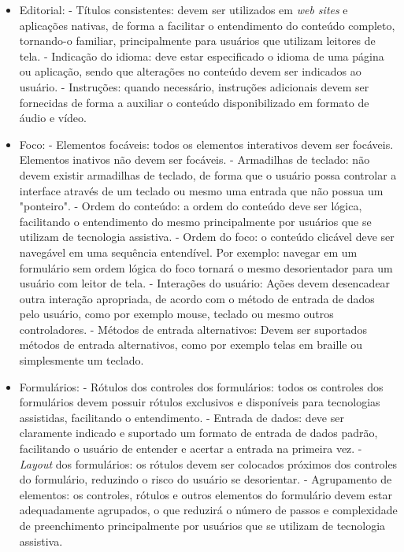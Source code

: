 \documentclass[
	12pt,				%
	oneside,			%
	a4paper,			%
	english,			%
	brazil				%
	]{abntex2ppgsi}
\begin{document}
\begin{itemize}
	\item Editorial:
		\subitem - Títulos consistentes: devem ser utilizados em \textit{web sites} e aplicações nativas, de forma a facilitar o entendimento do conteúdo completo, tornando-o familiar, principalmente para usuários que utilizam leitores de tela.
		\subitem - Indicação do idioma: deve estar especificado o idioma de uma página ou aplicação, sendo que alterações no conteúdo devem ser indicados ao usuário.
		\subitem - Instruções: quando necessário, instruções adicionais devem ser fornecidas de forma a auxiliar o conteúdo disponibilizado em formato de áudio e vídeo.
	\item Foco:
		\subitem - Elementos focáveis: todos os elementos interativos devem ser focáveis. Elementos inativos não devem ser focáveis.
		\subitem - Armadilhas de teclado: não devem existir armadilhas de teclado, de forma que o usuário possa controlar a interface através de um teclado ou mesmo uma entrada que não possua um "ponteiro".
		\subitem - Ordem do conteúdo: a ordem do conteúdo deve ser lógica, facilitando o entendimento do mesmo principalmente por usuários que se utilizam de tecnologia assistiva.
		\subitem - Ordem do foco: o conteúdo clicável deve ser navegável em uma sequência entendível. Por exemplo: navegar em um formulário sem ordem lógica do foco tornará o mesmo desorientador para um usuário com leitor de tela.
		\subitem - Interações do usuário: Ações devem desencadear outra interação apropriada, de acordo com o método de entrada de dados pelo usuário, como por exemplo mouse, teclado ou mesmo outros controladores.
		\subitem - Métodos de entrada alternativos: Devem ser suportados métodos de entrada alternativos, como por exemplo telas em braille ou simplesmente um teclado.
	\item Formulários:
		\subitem - Rótulos dos controles dos formulários: todos os controles dos formulários devem possuir rótulos exclusivos e disponíveis para tecnologias assistidas, facilitando o entendimento.
		\subitem - Entrada de dados: deve ser claramente indicado e suportado um formato de entrada de dados padrão, facilitando o usuário de entender e acertar a entrada na primeira vez.
		\subitem - \textit{Layout} dos formulários: os rótulos devem ser colocados próximos dos controles do formulário, reduzindo o risco do usuário se desorientar.
		\subitem - Agrupamento de elementos: os controles, rótulos e outros elementos do formulário devem estar adequadamente agrupados, o que reduzirá o número de passos e complexidade de preenchimento principalmente por usuários que se utilizam de tecnologia assistiva.

\end{itemize}
\end{document}

